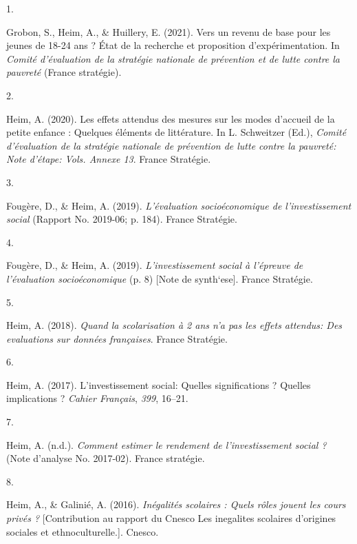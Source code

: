\documentclass[11pt,a4paper,]{awesome-cv}
\newlength{\cslhangindent}
\newlength{\csllabelwidth}
\newenvironment{CSLReferences}[2] %
 {\begin{list}{}{%
  \setlength{\itemindent}{0pt}
  \setlength{\leftmargin}{0pt}
  \setlength{\parsep}{0pt}
  \ifodd #1
   \setlength{\leftmargin}{\cslhangindent}
   \setlength{\itemindent}{-1\cslhangindent}
  \fi
  \setlength{\itemsep}{#2\baselineskip}}}
 {\end{list}}
\newcommand{\CSLLeftMargin}[1]{\parbox[t]{\csllabelwidth}{\strut#1\strut}}
\newcommand{\CSLRightInline}[1]{\parbox[t]{\linewidth - \csllabelwidth}{\strut#1\strut}}
\begin{document}
\label{refs-cb9d44783e3f3578d309302ce659e062}
\begin{CSLReferences}{0}{0}
\CSLLeftMargin{1. }%
\CSLRightInline{Grobon, S., Heim, A., \& Huillery, E. (2021). Vers un
revenu de base pour les jeunes de 18-24 ans ? État de la recherche et
proposition d'expérimentation. In \emph{Comité d'évaluation de la
stratégie nationale de prévention et de lutte contre la pauvreté}
(France stratégie).}

\CSLLeftMargin{2. }%
\CSLRightInline{Heim, A. (2020). Les effets attendus des mesures sur les
modes d'accueil de la petite enfance : Quelques éléments de littérature.
In L. Schweitzer (Ed.), \emph{Comité d'évaluation de la stratégie
nationale de prévention de lutte contre la pauvreté: Note d'étape: Vols.
Annexe 13}. France Stratégie.}

\CSLLeftMargin{3. }%
\CSLRightInline{Fougère, D., \& Heim, A. (2019). \emph{L'évaluation
socioéconomique de l'investissement social} (Rapport No. 2019-06; p.
184). France Stratégie.}

\CSLLeftMargin{4. }%
\CSLRightInline{Fougère, D., \& Heim, A. (2019). \emph{L'investissement
social à l'épreuve de l'évaluation socioéconomique} (p. 8) {[}Note de
synth`ese{]}. France Stratégie.}

\CSLLeftMargin{5. }%
\CSLRightInline{Heim, A. (2018). \emph{Quand la scolarisation à 2 ans
n'a pas les effets attendus: Des evaluations sur données françaises}.
France Stratégie.}

\CSLLeftMargin{6. }%
\CSLRightInline{Heim, A. (2017). L'investissement social: Quelles
significations ? Quelles implications ? \emph{Cahier Français},
\emph{399}, 16--21.}

\CSLLeftMargin{7. }%
\CSLRightInline{Heim, A. (n.d.). \emph{Comment estimer le rendement de
l'investissement social ?} (Note d'analyse No. 2017-02). France
stratégie.}

\CSLLeftMargin{8. }%
\CSLRightInline{Heim, A., \& Galinié, A. (2016). \emph{Inégalités
scolaires : Quels rôles jouent les cours privés ?} {[}Contribution au
rapport du Cnesco Les in\textquotesingle egalit\textquotesingle es
scolaires d'origines sociales et ethnoculturelle.{]}. Cnesco.}


\end{CSLReferences}
\end{document}
